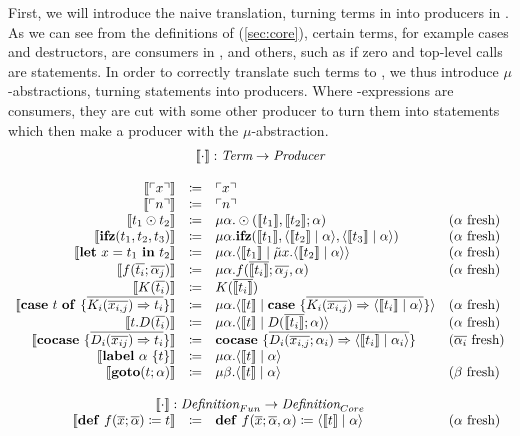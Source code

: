 First, we will introduce the naive translation, turning terms in \surfacelang{} into producers in \targetlang{}. 
As we can see from the definitions of \targetlang{} (\cref{sec:core}), certain terms, for example cases and destructors, are consumers in \targetlang{}, and others, such as if zero and top-level calls are statements.
In order to correctly translate such terms to \targetlang{}, we thus introduce $\mu$-abstractions, turning statements into producers.
Where \targetlang{}-expressions are consumers, they are cut with some other producer to turn them into statements which then make a producer with the $\mu$-abstraction.
\[
  \begin{array}{rcll}
    \multicolumn{4}{c}{\translate{\cdot} : \emph{Term} \rightarrow \emph{Producer}}\\
    \\
    \translate{\lit{x}} & \coloneq & \lit{x} & \\
    \translate{\lit{n}} & \coloneq & \lit{n} & \\
    \translate{t_1 \odot t_2} & \coloneq & \mu\alpha.\odot(\translate{t_1}, \translate{t_2}; \alpha) & \fresh{\alpha}\\
    \translate{\ifz{t_1}{t_2}{t_3}} & \coloneq & \mu\alpha.\ifz{\translate{t_1}}{\cut{\translate{t_2}}{\alpha}}{\cut{\translate{t_3}}{\alpha}} & \fresh{\alpha}\\
    \translate{\letin{x}{t_1}{t_2}} & \coloneq & \mu\alpha.\cut{\translate{t_1}}{\tilde{\mu}x.\cut{\translate{t_2}}{\alpha}} & \fresh{\alpha}\\
    \translate{f(\overline{t_i}; \overline{\alpha_j})} & \coloneq & \mu\alpha.f(\overline{\translate{t_i}}; \overline{\alpha_j},\alpha) & \fresh{\alpha}\\
    \translate{K(\overline{t_i})} & \coloneq & K(\overline{\translate{t_i}}) & \\
    \translate{\caseof{t}{\overline{K_i(\overline{x_{i,j}}) \Rightarrow t_i}}} & \coloneq & \mu\alpha.\cut{\translate{t}}{\case{\overline{K_i(\overline{x_{i,j}}) \Rightarrow \cut{\translate{t_i}}{\alpha}}}} & \fresh{\alpha}\\
    \translate{t.D(\overline{t_i})} & \coloneq & \mu\alpha.\cut{\translate{t}}{D(\overline{\translate{t_i}}; \alpha)} & \fresh{\alpha}\\
    \translate{\cocase{\overline{D_i(\overline{x_{ij}})\Rightarrow t_i}}} & \coloneq & \cocase{\overline{D_i(\overline{x_{i,j}}; \alpha_i) \Rightarrow \cut{\translate{t_i}}{\alpha_i}}} & \fresh{\overline{\alpha_i}}\\
    \translate{\lab{\alpha}{t}} & \coloneq & \mu\alpha.\cut{\translate{t}}{\alpha} & \\
    \translate{\goto{t}{\alpha}} & \coloneq & \mu\beta.\cut{\translate{t}}{\alpha} & \fresh{\beta}\\
    \\
    \multicolumn{4}{c}{\translate{\cdot{}}{} : \emph{Definition}_{Fun} \rightarrow \emph{Definition}_{Core}}\\
    \translate{\defi{f(\overline{x}; \overline{\alpha})}{t}}{} & \coloneq & \defi{f(\overline{x}; \overline{\alpha}, \alpha)}{\cut{\translate{t}}{\alpha}} & \fresh{\alpha}\\
    \\
  \end{array}
\]
